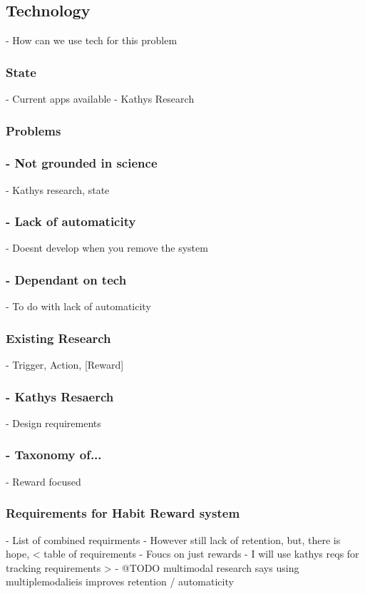   \subsection{Technology}
    - How can we use tech for this problem
  \subsubsection{State}
      - Current apps available\newline
      - Kathys Research
  \subsubsection{Problems}
      \subsubsection{- Not grounded in science}
        - Kathys research, state
      \subsubsection{- Lack of automaticity}
        - Doesnt develop when you remove the system
      \subsubsection{- Dependant on tech}
        - To do with lack of automaticity
  \subsubsection{Existing Research}
      - Trigger, Action, [Reward]
      \subsubsection{- Kathys Resaerch}
        - Design requirements
      \subsubsection{- Taxonomy of...}
        - Reward focused
  \subsubsection{Requirements for Habit Reward system}
      - List of combined requirments\newline
      - However still lack of retention, but, there is hope,\newline
      <\newline
        table of requirements\newline
        - Foucs on just rewards\newline
        - I will use kathys reqs for tracking requirements\newline
      >\newline
      - @TODO multimodal research says using multiplemodalieis improves retention / automaticity

